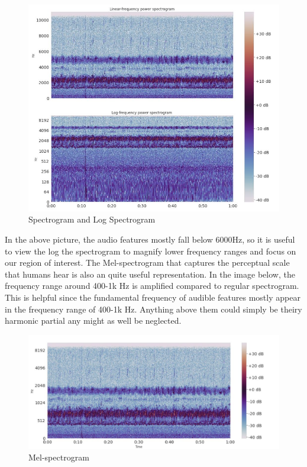 \documentclass[12pt]{article}
\begin{document}
\begin{figure}[h!]    
    \includegraphics[scale=.8, center]{spectrogram.JPG}   
    \caption{Spectrogram and Log Spectrogram}
    \label{fig:spectrogram}
  \end{figure}

In the above picture, the audio features mostly fall below 6000Hz, so it is useful to view the log the spectrogram to magnify lower frequency ranges and focus on our region of interest. The Mel-spectrogram that captures the perceptual scale that humans hear is also an quite useful representation. In the image below, the frequency range around 400-1k Hz is amplified compared to regular spectrogram. This is helpful since the fundamental frequency of audible features mostly appear in the frequency range of 400-1k Hz. Anything above them could simply be theiry harmonic partial any might as well be neglected. 


\begin{figure}[h!]
    \includegraphics[scale=.7, center]{melspectrogram.JPG}
    \caption{Mel-spectrogram}
    \label{fig:Mel-spectrogram}
\end{figure}
\end{document}
